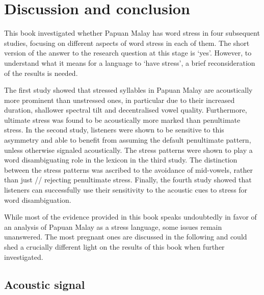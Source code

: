 \chapter{Discussion and conclusion} \label{chDisc}

This book investigated whether Papuan Malay has word stress in four subsequent studies, focusing on different aspects of word stress in each of them. The short version of the answer to the research question at this stage is `yes'. However, to understand what it means for a language to `have stress', a brief reconsideration of the results is needed.\par

The first study showed that stressed syllables in Papuan Malay are acoustically more prominent than unstressed ones, in particular due to their increased duration, shallower spectral tilt and decentralised vowel quality. Furthermore, ultimate stress was found to be acoustically more marked than penultimate stress. In the second study, listeners were shown to be sensitive to this asymmetry and able to benefit from assuming the default penultimate pattern, unless otherwise signaled acoustically. The stress patterns were shown to play a word disambiguating role in the lexicon in the third study. The distinction between the stress patterns was ascribed to the avoidance of mid-vowels, rather than just // rejecting penultimate stress. Finally, the fourth study showed that listeners can successfully use their sensitivity to the acoustic cues to stress for word disambiguation.\par

While most of the evidence provided in this book speaks undoubtedly in favor of an analysis of Papuan Malay as a stress language, some issues remain unanswered. The most pregnant ones are discussed in the following and could shed a crucially different light on the results of this book when further investigated.\par

\section{Acoustic signal}

